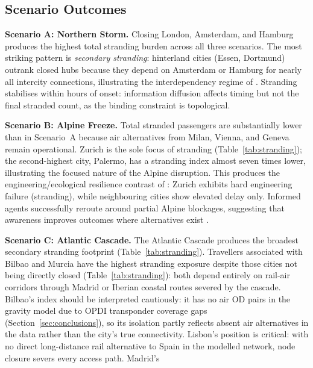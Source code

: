 \documentclass[12pt,a4paper]{article}
\begin{document}
\subsection{Scenario Outcomes}
\textbf{Scenario A: Northern Storm.}
Closing London, Amsterdam, and Hamburg produces the highest total stranding burden across all three scenarios.
The most striking pattern is \emph{secondary stranding}: hinterland cities (Essen, Dortmund)
outrank closed hubs because they depend on Amsterdam or Hamburg for nearly all intercity connections,
illustrating the interdependency regime of \citet{Buldyrev2010}.
Stranding stabilises within hours of onset: information diffusion affects timing but not the
final stranded count, as the binding constraint is topological.

\textbf{Scenario B: Alpine Freeze.}
Total stranded passengers are substantially lower than in Scenario~A
because air alternatives from Milan, Vienna, and Geneva remain operational.
Zurich is the sole focus of stranding (Table~\ref{tab:stranding});
the second-highest city, Palermo, has a stranding index almost seven times lower,
illustrating the focused nature of the Alpine disruption.
This produces the engineering/ecological resilience contrast of \citet{Reggiani2015}:
Zurich exhibits hard engineering failure (stranding), while neighbouring cities show elevated delay only.
Informed agents successfully reroute around partial Alpine blockages, suggesting that awareness improves outcomes where alternatives exist \citep{Leng2020}.

\textbf{Scenario C: Atlantic Cascade.}
The Atlantic Cascade produces the broadest secondary stranding footprint (Table~\ref{tab:stranding}).
Travellers associated with Bilbao and Murcia have the highest stranding exposure
despite those cities not being directly closed
(Table~\ref{tab:stranding}): both depend entirely on rail-air corridors through Madrid or
Iberian coastal routes severed by the cascade.
Bilbao's index should be interpreted cautiously: it has no air OD pairs in the gravity
model due to OPDI transponder coverage gaps (Section~\ref{sec:conclusions}),
so its isolation partly reflects absent air alternatives in the data rather than the city's true connectivity.
Lisbon's position is critical: with no direct long-distance rail alternative to Spain in the modelled network, node closure severs every access path.
Madrid's 
\end{document}
